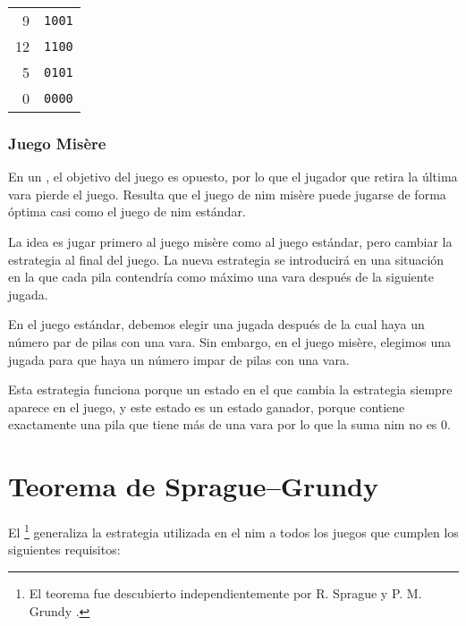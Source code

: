 \begin{center}
\begin{tabular}{r|r}
9 & \texttt{1001} \\
12 & \texttt{1100} \\
5 & \texttt{0101} \\
\hline
0 & \texttt{0000} \\
\end{tabular}
\end{center}

\subsubsection{Juego Misère}

En un , el objetivo del juego
es opuesto,
por lo que el jugador que retira la última vara
pierde el juego.
Resulta que el juego de nim misère puede
jugarse de forma óptima casi como el juego de nim estándar.

La idea es jugar primero al juego misère
como al juego estándar, pero cambiar la estrategia
al final del juego.
La nueva estrategia se introducirá en una situación
en la que cada pila contendría como máximo una vara
después de la siguiente jugada.

En el juego estándar, debemos elegir una jugada
después de la cual haya un número par de pilas con una vara.
Sin embargo, en el juego misère, elegimos una jugada para que
haya un número impar de pilas con una vara.

Esta estrategia funciona porque un estado en el que
cambia la estrategia siempre aparece en el juego,
y este estado es un estado ganador, porque
contiene exactamente una pila que tiene más de una vara
por lo que la suma nim no es 0.

\section{Teorema de Sprague–Grundy}


El \footnote{El teorema fue
descubierto independientemente por R. Sprague \cite{spr35} y P. M. Grundy \cite{gru39}.} generaliza la
estrategia utilizada en el nim a todos los juegos que cumplen
los siguientes requisitos:

